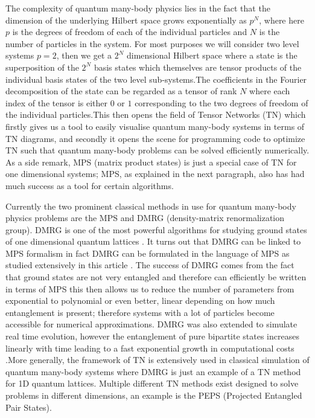\documentclass{physics_article}
\begin{document}
	The complexity of quantum many-body physics lies in the fact that the dimension of the underlying Hilbert space grows exponentially as $p^N$, where here $p$ is the degrees of freedom of each of the individual particles and $N$ is the number of particles in the system. For most purposes we will consider two level systems $p = 2$, then we get a $2^N$ dimensional Hilbert space where a state is the superposition of the $2^N$ basis states which themselves are tensor products of the individual basis states of the two level sub-systems.The coefficients in the Fourier decomposition of the state can be regarded as a tensor of rank $N$ where each index of the tensor is either $0$ or $1$ corresponding to the two degrees of freedom of the individual particles.This then opens the field of Tensor Networks (TN) \cite{orus_2014} which firstly gives us a tool to easily visualise quantum many-body systems in terms of TN diagrams, and secondly it opens the scene for programming code to optimize TN such that quantum many-body problems can be solved efficiently numerically. As a side remark, MPS (matrix product states) is just a special case of TN for one dimensional systems; MPS, as explained in the next paragraph, also has had much success as a tool for certain algorithms.

	Currently the two prominent classical methods in use for quantum many-body physics problems are the MPS and DMRG (density-matrix renormalization group). DMRG is one of the most powerful algorithms for studying ground states of one dimensional quantum lattices \cite{schollwock_2005,hallberg_2006}. It turns out that DMRG can be linked to MPS formalism \cite{https://doi.org/10.48550/arxiv.quant-ph/0608197} in fact DMRG can be formulated in the language of MPS as studied extensively in this article \cite{schollwock_2011}. The success of DMRG comes from the fact that ground states are not very entangled and therefore can efficiently be written in terms of MPS \cite{10.21468/SciPostPhysLectNotes.5} this then allows us to reduce the number of parameters from exponential to polynomial or even better, linear depending on how much entanglement is present; therefore systems with a lot of particles become accessible for numerical approximations. DMRG was also extended to simulate real time evolution, however the entanglement of pure bipartite states increases linearly with time leading to a fast exponential growth in computational costs \cite{10.21468/SciPostPhysLectNotes.5}.More generally, the framework of TN is extensively used in classical simulation of quantum many-body systems where DMRG is just an example of a TN method for 1D quantum lattices. Multiple different TN methods exist designed to solve problems in different dimensions, an example is the PEPS (Projected Entangled Pair States)\cite{orus_2014}. 
\end{document}

